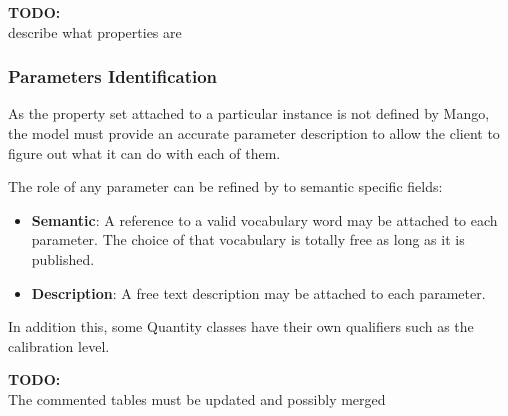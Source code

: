 \documentclass[11pt,a4paper]{ivoa}
\newcommand{\TODO}[1]{%
    \noindent%
    \colorbox{todocolor}{%
            \parbox{0.85\linewidth}{\sffamily \textbf{TODO:}\\
            #1}
    }%
    \vspace{2pt}

}
\begin{document}
\TODO{describe what properties are}

\subsubsection{Parameters Identification}
As the property set  attached to a particular instance is not defined by Mango,
the model must provide an accurate parameter description to allow the client to figure
out what it can do with each of them.

The role of any parameter can be refined by to semantic specific fields: 
\begin{itemize}
    \item \textbf{Semantic}: A reference to  a valid vocabulary word may be attached to each parameter. 
          The choice of that vocabulary is totally free as long as it is published.
    \item \textbf{Description}: A free text description may be attached to each parameter.
\end{itemize}

In addition this, some Quantity classes have their own qualifiers such as the calibration level.


\TODO{The commented tables must be updated and possibly merged}
\end{document}
